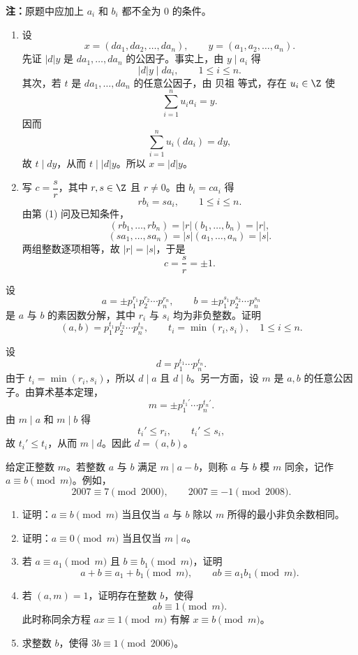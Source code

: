 \begin{solution}
	\textbf{注：}原题中应加上 \(a_i\) 和 \(b_i\) 都不全为 \(0\) 的条件。
	
	\begin{enumerate}
		\item 设
		\[
		x=(da_1,da_2,\ldots,da_n),\qquad y=(a_1,a_2,\ldots,a_n).
		\]
		先证 \(|d|y\) 是 \(da_1,\ldots,da_n\) 的公因子。事实上，由 \(y\mid a_i\) 得
		\[
		|d|y\mid da_i,\qquad 1\le i\le n.
		\]
		其次，若 \(t\) 是 \(da_1,\ldots,da_n\) 的任意公因子，由 贝祖 等式，存在 \(u_i\in\Z\) 使
		\[
		\sum_{i=1}^n u_ia_i=y.
		\]
		因而
		\[
		\sum_{i=1}^n u_i(da_i)=dy,
		\]
		故 \(t\mid dy\)，从而 \(t\mid |d|y\)。所以 \(x=|d|y\)。
		
		\item 写 \(c=\dfrac{s}{r}\)，其中 \(r,s\in\Z\) 且 \(r\ne0\)。由 \(b_i=ca_i\) 得
		\[
		rb_i=sa_i,
		\qquad 1\le i\le n.
		\]
		由第 (1) 问及已知条件，
		\[
		(rb_1,\ldots,rb_n)=|r|(b_1,\ldots,b_n)=|r|,
		\]
		\[
		(sa_1,\ldots,sa_n)=|s|(a_1,\ldots,a_n)=|s|.
		\]
		两组整数逐项相等，故 \(|r|=|s|\)，于是
		\[
		c=\frac{s}{r}=\pm1.
		\]
	\end{enumerate}
\end{solution}

\begin{problem}
 设
	\[
	a=\pm p_1^{r_1}p_2^{r_2}\cdots p_n^{r_n},\qquad
	b=\pm p_1^{s_1}p_2^{s_2}\cdots p_n^{s_n}
	\]
	是 \(a\) 与 \(b\) 的素因数分解，其中 \(r_i\) 与 \(s_i\) 均为非负整数。证明
	\[
	(a,b)=p_1^{t_1}p_2^{t_2}\cdots p_n^{t_n},
	\qquad t_i=\min(r_i,s_i),\quad 1\le i\le n.
	\]
\end{problem}

\begin{solution}
	设
	\[
	d=p_1^{t_1}\cdots p_n^{t_n}.
	\]
	由于 \(t_i=\min(r_i,s_i)\)，所以 \(d\mid a\) 且 \(d\mid b\)。另一方面，设 \(m\) 是 \(a,b\) 的任意公因子。由算术基本定理，
	\[
	m=\pm p_1^{t_1'}\cdots p_n^{t_n'}.
	\]
	由 \(m\mid a\) 和 \(m\mid b\) 得
	\[
	t_i'\le r_i,\qquad t_i'\le s_i,
	\]
	故 \(t_i'\le t_i\)，从而 \(m\mid d\)。因此 \(d=(a,b)\)。
\end{solution}

\begin{problem}
给定正整数 \(m\)。若整数 \(a\) 与 \(b\) 满足 \(m\mid a-b\)，则称 \(a\) 与 \(b\) 模 \(m\) 同余，记作
	\(a\equiv b\pmod m\)。例如，
	\[
	2007\equiv7\pmod{2000},\qquad 2007\equiv-1\pmod{2008}.
	\]
	\begin{enumerate}
		\item 证明：\(a\equiv b\pmod m\) 当且仅当 \(a\) 与 \(b\) 除以 \(m\) 所得的最小非负余数相同。
		\item 证明：\(a\equiv0\pmod m\) 当且仅当 \(m\mid a\)。
		\item 若 \(a\equiv a_1\pmod m\) 且 \(b\equiv b_1\pmod m\)，证明
		\[
		a+b\equiv a_1+b_1\pmod m,
		\qquad ab\equiv a_1b_1\pmod m.
		\]
		\item 若 \((a,m)=1\)，证明存在整数 \(b\)，使得
		\[
		ab\equiv1\pmod m.
		\]
		此时称同余方程 \(ax\equiv1\pmod m\) 有解 \(x\equiv b\pmod m\)。
		\item 求整数 \(b\)，使得 \(3b\equiv1\pmod{2006}\)。
	\end{enumerate}
\end{problem}

